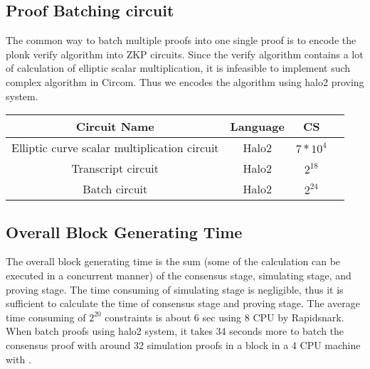 \subsection{Proof Batching 
circuit}
The common way to batch multiple proofs into one single proof is to encode the plonk verify algorithm into ZKP circuits. Since the verify algorithm contains a lot of calculation of elliptic scalar multiplication, it is infeasible to implement such complex algorithm in Circom. Thus we encodes the algorithm using halo2 proving system. 

\begin{table}[!ht]
\small
\centering
\begin{tabular}{ | c | c | c | c | }
\hline
Circuit Name & Language & CS \\
\hline
Elliptic curve scalar multiplication circuit & Halo2 & $7*10^4$ \\
\hline
Transcript circuit & Halo2 & $2^{18}$ \\
\hline
Batch circuit & Halo2 & $2^{24}$ \\
\hline
\end{tabular}
\end{table}

\subsection{Overall Block Generating Time}
The overall block generating time is the sum (some of the calculation can be executed in a concurrent manner) of the consensus stage, simulating stage, and proving stage. The time consuming of simulating stage is negligible, thus it is sufficient to calculate the time of consensus stage and proving stage. The average time consuming of $2^{20}$ constraints is about 6 sec using 8 CPU by Rapidsnark. When batch proofs using halo2 system, it takes 34 seconds more to batch the consensus proof with around 32 simulation proofs in a block in a 4 CPU machine with .

